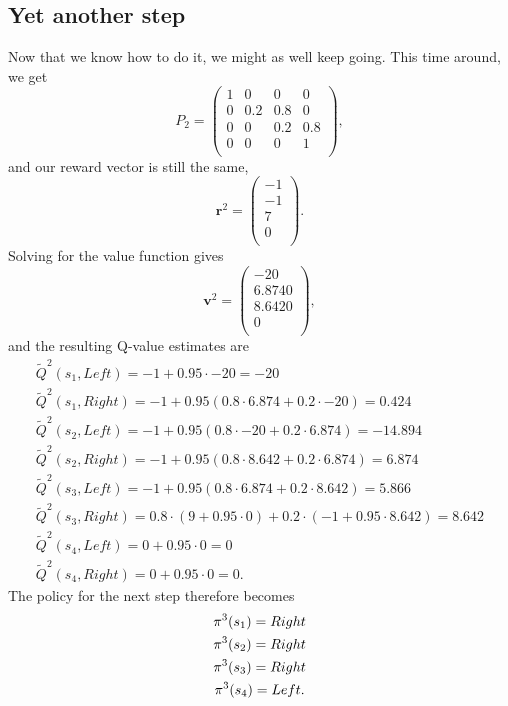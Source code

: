 \documentclass[a4paper]{article}
\begin{document}
\subsection{Yet another step}
Now that we know how to do it, we might as well keep going.
This time around, we get
\begin{equation*}
  P_2 =
  \begin{pmatrix}
      1   & 0   & 0   & 0   \\
      0   & 0.2 & 0.8 & 0   \\
      0   & 0   & 0.2 & 0.8 \\
      0   & 0   & 0   & 1   \\
  \end{pmatrix} ,
\end{equation*}
and our reward vector is still the same,
\begin{equation*}
  \mathbf{r}^2 = \begin{pmatrix}
    -1 \\ -1 \\ 7 \\ 0 \\
  \end{pmatrix} .
\end{equation*}
Solving for the value function gives
\begin{equation*}
  \mathbf{v}^2 = \begin{pmatrix}
    -20 \\ 6.8740 \\ 8.6420 \\ 0 \\
  \end{pmatrix} ,
\end{equation*}
and the resulting Q-value estimates are
\begin{gather*}
  \widetilde{Q}^2(s_1, Left)  = -1 + 0.95 \cdot -20 = -20 \\
  \widetilde{Q}^2(s_1, Right) = -1 + 0.95 (0.8 \cdot 6.874 + 0.2 \cdot -20) = 0.424 \\
  \widetilde{Q}^2(s_2, Left)  = -1 + 0.95 (0.8 \cdot -20 + 0.2 \cdot 6.874) = -14.894 \\
  \widetilde{Q}^2(s_2, Right) = -1 + 0.95 (0.8 \cdot 8.642 + 0.2 \cdot 6.874) = 6.874 \\
  \widetilde{Q}^2(s_3, Left)  = -1 + 0.95 (0.8 \cdot 6.874 + 0.2 \cdot 8.642) = 5.866 \\
  \widetilde{Q}^2(s_3, Right) = 0.8 \cdot (9 + 0.95 \cdot 0) + 0.2 \cdot (-1 + 0.95 \cdot 8.642) = 8.642 \\
  \widetilde{Q}^2(s_4, Left)  = 0 + 0.95 \cdot 0 = 0 \\
  \widetilde{Q}^2(s_4, Right) = 0 + 0.95 \cdot 0 = 0 .
\end{gather*}
The policy for the next step therefore becomes
\begin{gather*}
  \pi^3(s_1) = Right \\
  \pi^3(s_2) = Right \\
  \pi^3(s_3) = Right \\
  \pi^3(s_4) = Left .
\end{gather*}
\end{document}
